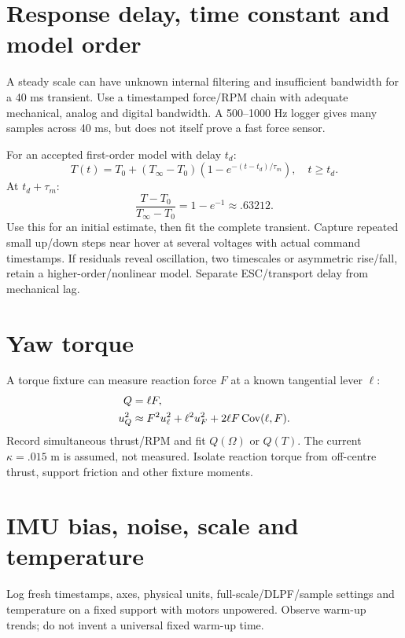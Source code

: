 \section{Response delay, time constant and model order}
A steady scale can have unknown internal filtering and insufficient bandwidth
for a 40 ms transient. Use a timestamped force/RPM chain with adequate mechanical,
analog and digital bandwidth. A 500--1000 Hz logger gives many samples across
40 ms, but does not itself prove a fast force sensor.

For an accepted first-order model with delay $t_d$:
\begin{equation}
T(t)=T_0+(T_\infty-T_0)\left(1-e^{-(t-t_d)/\tau_m}\right),\quad t\ge t_d.
\end{equation}
At $t_d+\tau_m$:
\begin{equation}
\frac{T-T_0}{T_\infty-T_0}=1-e^{-1}\approx.63212.
\end{equation}
Use this for an initial estimate, then fit the complete transient. Capture repeated
small up/down steps near hover at several voltages with actual command timestamps.
If residuals reveal oscillation, two timescales or asymmetric rise/fall, retain a
higher-order/nonlinear model. Separate ESC/transport delay from mechanical lag.

\section{Yaw torque}
A torque fixture can measure reaction force $F$ at a known tangential lever $\ell$:
\begin{align}
Q&=\ell F,\\
u_Q^2&\approx F^2u_\ell^2+\ell^2u_F^2+2\ell F\operatorname{Cov}(\ell,F).
\end{align}
Record simultaneous thrust/RPM and fit $Q(\Omega)$ or $Q(T)$.
The current $\kappa=.015$ m is assumed, not measured. Isolate reaction torque
from off-centre thrust, support friction and other fixture moments.

\section{IMU bias, noise, scale and temperature}
Log fresh timestamps, axes, physical units, full-scale/DLPF/sample settings and
temperature on a fixed support with motors unpowered. Observe warm-up trends;
do not invent a universal fixed warm-up time.

